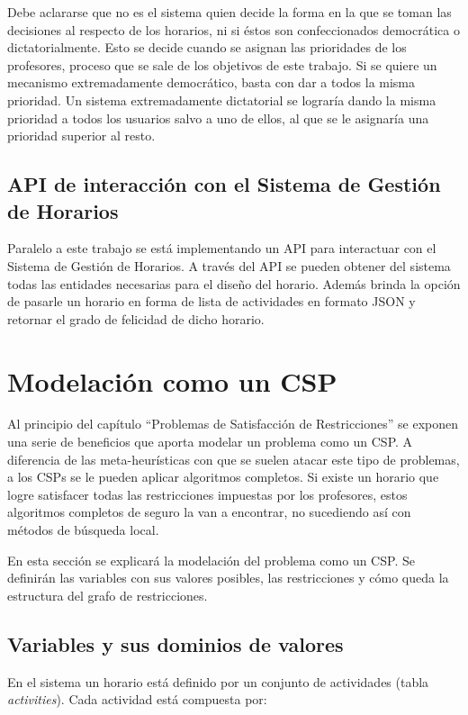 Debe aclararse que no es el sistema quien decide la forma en la que se toman las decisiones al respecto de los horarios, ni si éstos son confeccionados democrática o dictatorialmente. Esto se decide cuando se asignan las prioridades de los profesores, proceso que se sale de los objetivos de este trabajo. Si se quiere un mecanismo extremadamente democrático, basta con dar a todos la misma prioridad. Un sistema extremadamente dictatorial se lograría dando la misma prioridad a todos los usuarios salvo a uno de ellos, al que se le asignaría una prioridad superior al resto.

\subsection{API de interacci\'on con el Sistema de Gesti\'on de Horarios}

Paralelo a este trabajo se est\'a implementando un API para interactuar con el Sistema de Gesti\'on de Horarios. A trav\'es del API se pueden obtener del sistema todas las entidades necesarias para el diseño del horario. Adem\'as brinda la opci\'on de pasarle un horario en forma de lista de actividades en formato JSON y retornar el grado de felicidad de dicho horario.

\section{Modelaci\'on como un CSP}

Al principio del cap\'itulo ``Problemas de Satisfacción de Restricciones'' se exponen una serie de beneficios que aporta modelar un problema como un CSP. A diferencia de las meta-heur\'isticas con que se suelen atacar este tipo de problemas, a los CSPs se le pueden aplicar algoritmos completos. Si existe un horario que logre satisfacer todas las restricciones impuestas por los profesores, estos algoritmos completos de seguro la van a encontrar, no sucediendo as\'i con m\'etodos de b\'usqueda local.

En esta secci\'on se explicar\'a la modelaci\'on del problema como un CSP. Se definir\'an las variables con sus valores posibles, las restricciones y c\'omo queda la estructura del grafo de restricciones.

\subsection{Variables y sus dominios de valores}

En el sistema un horario est\'a definido por un conjunto de actividades (tabla \emph{activities}). Cada actividad est\'a compuesta por:

